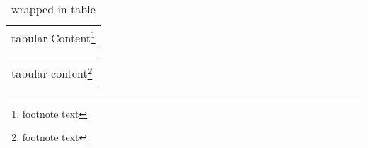 \documentclass{scrartcl}
\begin{document}
\begin{table}
\begin{tabular}{l}
tabular Content\footnote{footnote text}
\end{tabular}
\caption{wrapped in table}
\end{table}
\begin{tabular}{l}
tabular content\footnote{footnote text}
\end{tabular}
\end{document}
